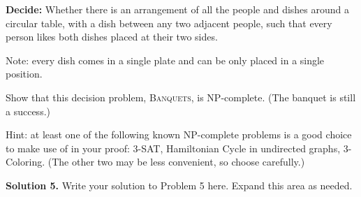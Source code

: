 \documentclass[12pt]{article}
\begin{document}
\noindent\textbf{Decide:} Whether there is an arrangement of all the people and dishes around a circular table, with a dish between any two adjacent people, such that every person likes both dishes placed at their two sides.
\vspace{0.5em}

Note: every dish comes in a single plate and can be only placed in a single position.

Show that this decision problem, \textsc{Banquets}, is NP-complete. (The banquet is still a success.)

Hint: at least one of the following known NP-complete problems is a good choice to make use of in your proof: 3-SAT, Hamiltonian Cycle in undirected graphs, 3-Coloring. (The other two may be less convenient, so choose carefully.)

\vspace{1em}
\noindent\textbf{Solution 5.} Write your solution to Problem 5 here. Expand this area as needed.
\end{document}
